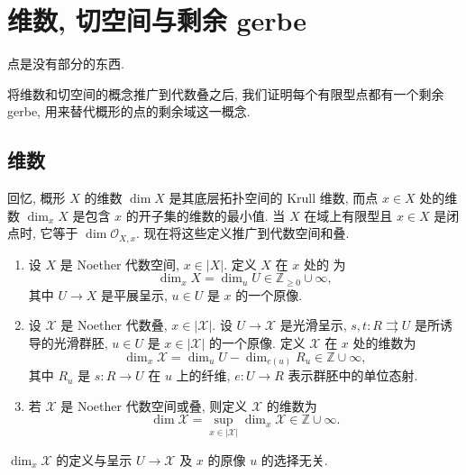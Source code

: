 \section{维数, 切空间与剩余 gerbe}\label{src:4.5-section}
\begin{epigraph}
点是没有部分的东西.
\end{epigraph}
将维数和切空间的概念推广到代数叠之后, 我们证明每个有限型点都有一个剩余 gerbe, 用来替代概形的点的剩余域这一概念.
\subsection{维数}\label{src:4.5.1-subsection}
回忆, 概形 $X$ 的维数 $\dim X$ 是其底层拓扑空间的 Krull 维数, 而点 $x\in X$ 处的维数 $\dim_x X$ 是包含 $x$ 的开子集的维数的最小值. 当 $X$ 在域上有限型且 $x\in X$ 是闭点时, 它等于 $\dim\mathcal O_{X,x}$. 现在将这些定义推广到代数空间和叠.
\begin{definition}[维数]\label{src:4.5.1}
\begin{enumerate}[(1)]
\item 设 $X$ 是 Noether 代数空间, $x\in|X|$. 定义 $X$ 在 $x$ 处的 为
\[
\dim_x X=\dim_u U\in\mathbb Z_{\geq0}\cup\infty,
\]
其中 $U\to X$ 是平展呈示, $u\in U$ 是 $x$ 的一个原像.
\item 设 $\mathcal X$ 是 Noether 代数叠, $x\in|\mathcal X|$. 设 $U\to\mathcal X$ 是光滑呈示, $s,t:R\rightrightarrows U$ 是所诱导的光滑群胚, $u\in U$ 是 $x\in|\mathcal X|$ 的一个原像. 定义 $\mathcal X$ 在 $x$ 处的维数为
\[
\dim_x\mathcal X=\dim_u U-\dim_{e(u)}R_u\in\mathbb Z\cup\infty,
\]
其中 $R_u$ 是 $s:R\to U$ 在 $u$ 上的纤维, $e:U\to R$ 表示群胚中的单位态射.
\item 若 $\mathcal X$ 是 Noether 代数空间或叠, 则定义 $\mathcal X$ 的维数为
\[
\dim\mathcal X=\sup_{x\in|\mathcal X|}\dim_x\mathcal X\in\mathbb Z\cup\infty.
\]
\end{enumerate}
\end{definition}
\begin{proposition}\label{src:4.5.2}
$\dim_x\mathcal X$ 的定义与呈示 $U\to\mathcal X$ 及 $x$ 的原像 $u$ 的选择无关.
\end{proposition}
